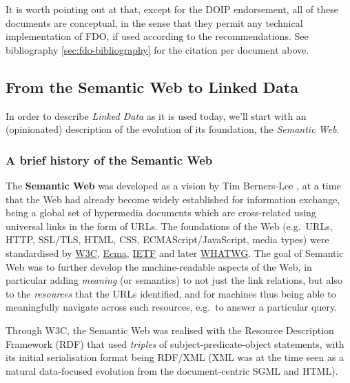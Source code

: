\documentclass[fleqn,10pt,NOlineno]{wlpeerjlua}
\begin{document}
It is worth pointing out at that, except for the DOIP endorsement, all of these documents are conceptual, in the sense that they permit any technical implementation of FDO, if used according to the recommendations. See bibliography \vref*{sec:fdo-bibliography} for the citation per document above.

\subsection*{From the Semantic Web to Linked Data}\label{sec:ld}

In order to describe \emph{Linked Data} as it is used today, we'll start with an (opinionated) description of the evolution of its foundation, the \emph{Semantic Web}.

\subsubsection*{A brief history of the Semantic Web}\label{sec:semweb}

The \textbf{Semantic Web} was developed as a vision by Tim Berners-Lee \autocite{berners-leeWeavingWebOriginal1999}, at a time that the Web had already become widely established for information exchange, being a global set of hypermedia documents which are cross-related using universal links in the form of URLs. The foundations of the Web (e.g.~URLs, HTTP, SSL/TLS, HTML, CSS, ECMAScript/JavaScript, media types) were standardised by \href{https://www.w3.org/standards/}{W3C}, \href{https://www.ecma-international.org/}{Ecma}, \href{https://www.ietf.org/standards/}{IETF} and later \href{https://whatwg.org/}{WHATWG}. The goal of Semantic Web was to further develop the machine-readable aspects of the Web, in particular adding \emph{meaning} (or semantics) to not just the link relations, but also to the \emph{resources} that the URLs identified, and for machines thus being able to meaningfully navigate across such resources, e.g.~to answer a particular query.

Through W3C, the Semantic Web was realised with the Resource Description Framework (RDF) \autocite{w3-rdf11-primer} that used \emph{triples} of subject-predicate-object statements, with its initial serialisation format \autocite{w3-rdf-syntax} being RDF/XML (XML was at the time seen as a natural data-focused evolution from the document-centric SGML and HTML).
\end{document}
